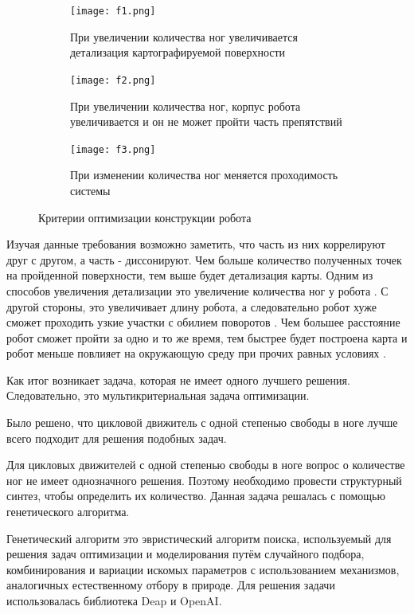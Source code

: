 \begin{figure}[H]
    \begin{subfigure}{0.9\textwidth}
        \centering\texttt{[image: f1.png]}
        \caption{При увеличении количества ног увеличивается детализация картографируемой поверхности}
        \label{fig:f1.png}
    \end{subfigure}

    \begin{subfigure}{0.9\textwidth}
        \centering\texttt{[image: f2.png]}
        \caption{При увеличении количества ног, корпус робота увеличивается и он не может пройти часть препятствий}
        \label{fig:f2.png}
    \end{subfigure}

    \begin{subfigure}{0.9\textwidth}
        \centering\texttt{[image: f3.png]}
        \caption{При изменении количества ног меняется проходимость системы}
        \label{fig:f3.png}
    \end{subfigure}

\caption{Критерии оптимизации конструкции робота}
\label{fig:opti_criteria}
\end{figure}
Изучая данные требования возможно заметить, что часть из них коррелируют друг с другом, а часть - диссонируют. Чем больше количество полученных точек на пройденной поверхности, тем выше будет детализация карты. Одним из способов увеличения детализации это увеличение количества ног у робота . С другой стороны, это увеличивает длину робота, а следовательно робот хуже сможет проходить узкие участки с обилием поворотов . Чем большее расстояние робот сможет пройти за одно и то же время, тем быстрее будет построена карта и робот меньше повлияет на окружающую среду при прочих равных условиях . 

Как итог возникает задача, которая не имеет одного лучшего решения. Следовательно, это мультикритериальная задача оптимизации.


Было решено, что цикловой движитель с одной степенью свободы в ноге лучше всего подходит для решения подобных задач.

Для цикловых движителей с одной степенью свободы в ноге вопрос о количестве ног не имеет однозначного решения. Поэтому необходимо провести структурный синтез, чтобы определить их количество. Данная задача решалась с помощью генетического алгоритма.

Генетический алгоритм это эвристический алгоритм поиска, используемый для решения задач оптимизации и моделирования путём случайного подбора, комбинирования и вариации искомых параметров с использованием механизмов, аналогичных естественному отбору в природе. Для решения задачи использовалась библиотека Deap и OpenAI.

